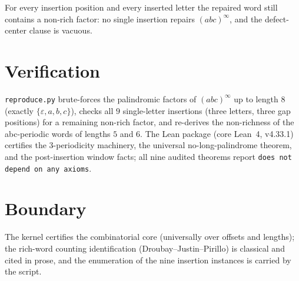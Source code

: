 \documentclass[11pt]{article}
\begin{document}
For every insertion position and every inserted letter the repaired
word still contains a non-rich factor: no single insertion repairs
$(abc)^\infty$, and the defect-center clause is vacuous.

\section{Verification}

\texttt{reproduce.py} brute-forces the palindromic factors of
$(abc)^\infty$ up to length $8$ (exactly $\{\varepsilon, a, b, c\}$),
checks all $9$ single-letter insertions (three letters, three gap
positions) for a remaining non-rich factor, and re-derives the
non-richness of the abc-periodic words of lengths $5$ and $6$. The
Lean package (core Lean~4, v4.33.1) certifies the 3-periodicity
machinery, the universal no-long-palindrome theorem, and the
post-insertion window facts; all nine audited theorems report
\texttt{does not depend on any axioms}.

\section{Boundary}

The kernel certifies the combinatorial core (universally over offsets
and lengths); the rich-word counting identification
(Droubay--Justin--Pirillo) is classical and cited in prose, and the
enumeration of the nine insertion instances is carried by the script.
\end{document}
